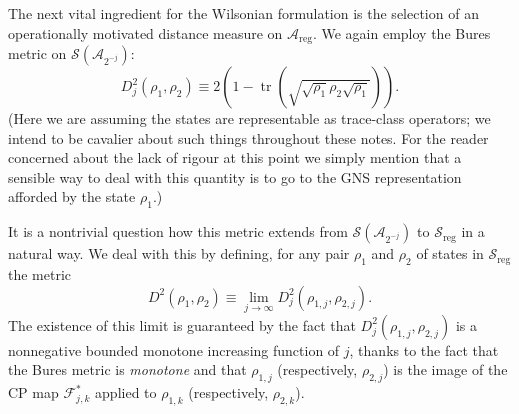 \documentclass[11pt]{amsart}
\DeclareMathOperator{\tr}{tr}
\theoremstyle{plain}%
\theoremstyle{definition}
\theoremstyle{remark}
\begin{document}
The next vital ingredient for the Wilsonian formulation is the selection of an operationally motivated distance measure on $\mathcal{A}_{\text{reg}}$. We again employ the Bures metric on $\mathcal{S}(\mathcal{A}_{2^{-j}})$:
\begin{equation}
	D^2_j(\rho_1,\rho_2) \equiv 2\left(1-\tr\left(\sqrt{\sqrt{\rho_1}\rho_2\sqrt{\rho_1}}\right)\right).
\end{equation}
(Here we are assuming the states are representable as trace-class operators; we intend to be cavalier about such things throughout these notes. For the reader concerned about the lack of rigour at this point we simply mention that a sensible way to deal with this quantity is to go to the GNS representation afforded by the state $\rho_1$.)

It is a nontrivial question how this metric extends from $\mathcal{S}(\mathcal{A}_{2^{-j}})$ to $\mathcal{S}_{\text{reg}}$ in a natural way. We deal with this by defining, for any pair $\rho_1$ and $\rho_2$ of states in $\mathcal{S}_{\text{reg}}$ the metric
\begin{equation}
	D^2(\rho_1,\rho_2) \equiv \lim_{j\rightarrow\infty}  D^2_j(\rho_{1,j},\rho_{2,j}).
\end{equation}
The existence of this limit is guaranteed by the fact that $D^2_j(\rho_{1,j},\rho_{2,j})$ is a nonnegative bounded monotone increasing function of $j$, thanks to the fact that the Bures metric is \emph{monotone} and that $\rho_{1,j}$ (respectively, $\rho_{2,j}$) is the image of the CP map $\mathcal{F}_{j,k}^{*}$ applied to $\rho_{1,k}$ (respectively, $\rho_{2,k}$).
\end{document}
